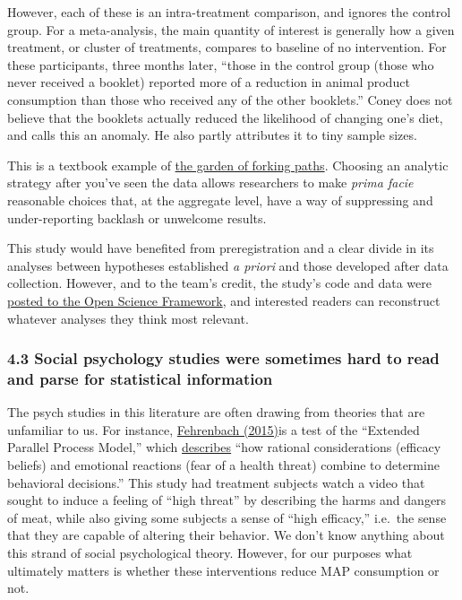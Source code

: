 \documentclass[
  letterpaper,
  DIV=11,
  numbers=noendperiod]{scrartcl}
\begin{document}
However, each of these is an intra-treatment comparison, and ignores the
control group. For a meta-analysis, the main quantity of interest is
generally how a given treatment, or cluster of treatments, compares to
baseline of no intervention. For these participants, three months later,
``those in the control group (those who never received a booklet)
reported more of a reduction in animal product consumption than those
who received any of the other booklets.'' Coney does not believe that
the booklets actually reduced the likelihood of changing one's diet, and
calls this an anomaly. He also partly attributes it to tiny sample
sizes.

This is a textbook example of
\href{http://www.stat.columbia.edu/~gelman/research/unpublished/p_hacking.pdf}{the
garden of forking paths}. Choosing an analytic strategy after you've
seen the data allows researchers to make \emph{prima facie} reasonable
choices that, at the aggregate level, have a way of suppressing and
under-reporting backlash or unwelcome results.

This study would have benefited from preregistration and a clear divide
in its analyses between hypotheses established \emph{a priori} and those
developed after data collection. However, and to the team's credit, the
study's code and data were \href{https://osf.io/rg2ve}{posted to the
Open Science Framework}, and interested readers can reconstruct whatever
analyses they think most relevant.

\subsubsection{4.3 Social psychology studies were sometimes hard to read
and parse for statistical
information}\label{social-psychology-studies-were-sometimes-hard-to-read-and-parse-for-statistical-information}

The psych studies in this literature are often drawing from theories
that are unfamiliar to us. For instance,
\href{https://www.proquest.com/docview/1712399091?pq-origsite=gscholar&fromopenview=true}{Fehrenbach
(2015)}is a test of the ``Extended Parallel Process Model,'' which
\href{https://www.healthcommcapacity.org/wp-content/uploads/2014/09/Extended-Parallel-Processing-Model.pdf}{describes}
``how rational considerations (efficacy beliefs) and emotional reactions
(fear of a health threat) combine to determine behavioral decisions.''
This study had treatment subjects watch a video that sought to induce a
feeling of ``high threat'' by describing the harms and dangers of meat,
while also giving some subjects a sense of ``high efficacy,'' i.e.~the
sense that they are capable of altering their behavior. We don't know
anything about this strand of social psychological theory. However, for
our purposes what ultimately matters is whether these interventions
reduce MAP consumption or not.
\end{document}
